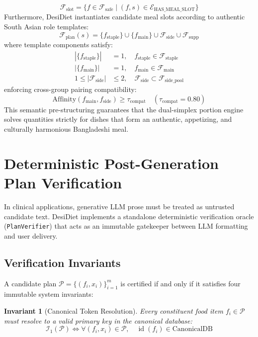\documentclass[5p,times,twocolumn]{elsarticle}
\makeatletter
\newtheorem{invariant}{Invariant}
\def\systemname{DesiDiet}%
\def\my@bx{bx}
\def\my@b{b}
\DeclareRobustCommand{\systemname}{%
  \texorpdfstring{%
    \ifx\f@series\my@bx
      DesiDiet%
    \else\ifx\f@series\my@b
      DesiDiet%
    \else
      \textsc{DesiDiet}%
    \fi\fi
  }{DesiDiet}%
}
\makeatother
\begin{document}
\begin{enumerate}[leftmargin=*,itemsep=1.5pt]
\begin{equation}
  \mathcal{F}_{\text{slot}} = \{ f \in \mathcal{F}_{\text{safe}} \mid (f, s) \in \mathcal{E}_{\text{HAS\_MEAL\_SLOT}} \}
  \end{equation}
  Furthermore, \systemname{} instantiates candidate meal slots according to authentic South Asian role templates:
  \begin{equation}
  \mathcal{F}_{\text{plan}}(s) = \{f_{\text{staple}}\} \cup \{f_{\text{main}}\} \cup \mathcal{F}_{\text{side}} \cup \mathcal{F}_{\text{supp}}
  \end{equation}
  where template components satisfy:
  \begin{align}
  |\{f_{\text{staple}}\}| &= 1, \quad f_{\text{staple}} \in \mathcal{F}_{\text{staple}} \\
  |\{f_{\text{main}}\}| &= 1, \quad f_{\text{main}} \in \mathcal{F}_{\text{main}} \\
  1 \le |\mathcal{F}_{\text{side}}| &\le 2, \quad \mathcal{F}_{\text{side}} \subset \mathcal{F}_{\text{side\_pool}}
  \end{align}
  enforcing cross-group pairing compatibility:
  \begin{equation}
  \text{Affinity}(f_{\text{main}}, f_{\text{side}}) \ge \tau_{\text{compat}} \quad (\tau_{\text{compat}} = 0.80)
  \end{equation}
  This semantic pre-structuring guarantees that the dual-simplex portion engine solves quantities strictly for dishes that form an authentic, appetizing, and culturally harmonious Bangladeshi meal.
\end{enumerate}

\section{Deterministic Post-Generation Plan Verification}
\label{sec:verification}

In clinical applications, generative LLM prose must be treated as untrusted candidate text. \systemname{} implements a standalone deterministic verification oracle (\texttt{PlanVerifier}) that acts as an immutable gatekeeper between LLM formatting and user delivery.

\subsection{Verification Invariants}
A candidate plan $\mathcal{P} = \{(f_i, x_i)\}_{i=1}^m$ is certified if and only if it satisfies four immutable system invariants:
\begin{invariant}[Canonical Token Resolution]
Every constituent food item $f_i \in \mathcal{P}$ must resolve to a valid primary key in the canonical database:
\begin{equation}
\mathcal{I}_1(\mathcal{P}) \iff \forall (f_i, x_i) \in \mathcal{P}, \quad \operatorname{id}(f_i) \in \text{CanonicalDB}
\end{equation}
\end{invariant}
\end{document}
